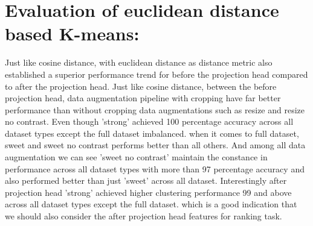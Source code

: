 \section{Evaluation of euclidean distance based K-means:}
Just like  cosine distance, with euclidean distance as distance metric also established a superior performance trend for before the projection head compared to after the projection head. Just like  cosine distance, between the before projection head, data augmentation pipeline with cropping have far better performance than without cropping data augmentations such as resize and resize no contrast. Even though 'strong' achieved 100 percentage accuracy across all dataset types except the full dataset imbalanced. when it comes to full dataset, sweet and sweet no contrast performs better than all others. And among all data augmentation we can see 'sweet no contrast' maintain the constance in performance across all dataset types with more than 97 percentage accuracy and also performed better than just 'sweet' across all dataset. Interestingly after projection head  'strong' achieved higher clustering performance 99 and above across all dataset types except the full dataset. which is a good indication that we should also consider the after projection head features for ranking task.
\begin{table}[H]
    \centering
    \caption{Evaluation Results on Different Datasets and Augmentations with Euclidean Distance}
    \label{tab:evaluation_results_euclidean}
\end{table}

